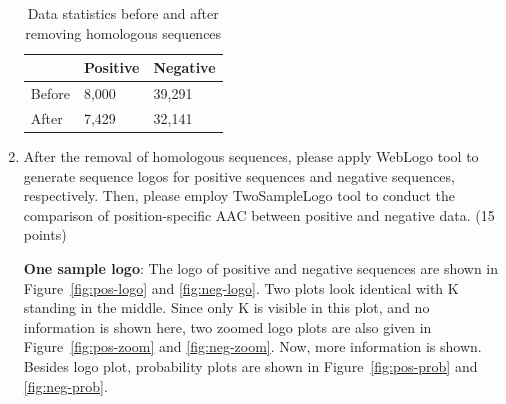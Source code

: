 \documentclass{article}
\begin{document}
\begin{enumerate}
    \begin{table}[htbp]
        \centering\begin{tabular}{lll}
            \hline
            & Positive & Negative \\ \hline
     Before & 8,000    & 39,291   \\
     After  & 7,429    & 32,141   \\ \hline
     \end{tabular}
        \caption{Data statistics before and after removing homologous sequences}
        \label{tab:statistics}
    \end{table}

    \item After the removal of homologous sequences, please apply WebLogo tool to generate sequence logos for positive sequences and negative sequences, respectively. Then, please employ TwoSampleLogo tool to conduct the comparison of position-specific AAC between positive and negative data. (15 points)
    
    \textbf{One sample logo}: The logo of positive and negative sequences are shown in Figure~\ref{fig:pos-logo} and \ref{fig:neg-logo}. Two plots look identical with K standing in the middle. Since only K is visible in this plot, and no information is shown here, two zoomed logo plots are also given in Figure~\ref{fig:pos-zoom} and \ref{fig:neg-zoom}. Now, more information is shown. Besides logo plot, probability plots are shown in Figure~\ref{fig:pos-prob} and \ref{fig:neg-prob}. 
    

\end{enumerate}
\end{document}
